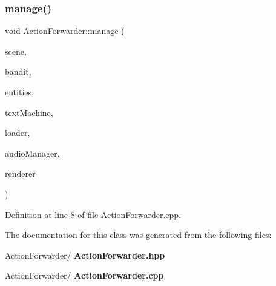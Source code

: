 \subsubsection{manage()}
{\footnotesize\ttfamily void Action\+Forwarder\+::manage (\begin{DoxyParamCaption}\item[{const std\+::shared\+\_\+ptr$<$ \textbf{ Scene} $>$ \&}]{scene,  }\item[{const std\+::shared\+\_\+ptr$<$ \textbf{ One\+Armed\+Bandit} $>$ \&}]{bandit,  }\item[{const std\+::vector$<$ std\+::shared\+\_\+ptr$<$ \textbf{ mv\+::\+Entity} $>$$>$ \&}]{entities,  }\item[{const std\+::shared\+\_\+ptr$<$ \textbf{ Text\+Machine} $>$ \&}]{text\+Machine,  }\item[{const std\+::shared\+\_\+ptr$<$ \textbf{ Loader} $>$ \&}]{loader,  }\item[{const std\+::shared\+\_\+ptr$<$ \textbf{ Audio\+Manager} $>$ \&}]{audio\+Manager,  }\item[{S\+D\+L\+\_\+\+Renderer $\ast$}]{renderer }\end{DoxyParamCaption})}



Definition at line 8 of file Action\+Forwarder.\+cpp.



The documentation for this class was generated from the following files\+:\begin{DoxyCompactItemize}
\item 
Action\+Forwarder/\textbf{ Action\+Forwarder.\+hpp}\item 
Action\+Forwarder/\textbf{ Action\+Forwarder.\+cpp}\end{DoxyCompactItemize}
